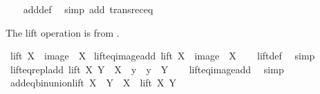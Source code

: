 \begin{isabellebody}
%
\isadelimproof
\ \ %
\endisadelimproof
%
\isatagproof
{}\isamarkupfalse%
\ add{\isacharunderscore}{\kern0pt}def\ \isamarkupfalse%
\ {\isacharparenleft}{\kern0pt}simp\ add{\isacharcolon}{\kern0pt}\ transrec{\isacharunderscore}{\kern0pt}eq{\isacharparenright}{\kern0pt}%
\endisatagproof
{\isafoldproof}%
%
\isadelimproof
%
\endisadelimproof
%
\begin{isamarkuptext}%
The lift operation is from \cite{kirby_set_arithemtics}.%
\end{isamarkuptext}\isamarkuptrue%
\isamarkupfalse%
\ {\isachardoublequoteopen}lift\ X\ {\isasymequiv}\ image\ {\isacharparenleft}{\kern0pt}{\isacharparenleft}{\kern0pt}{\isacharplus}{\kern0pt}{\isacharparenright}{\kern0pt}\ X{\isacharparenright}{\kern0pt}{\isachardoublequoteclose}\isanewline
\isanewline
{}\isamarkupfalse%
\ lift{\isacharunderscore}{\kern0pt}eq{\isacharunderscore}{\kern0pt}image{\isacharunderscore}{\kern0pt}add{\isacharcolon}{\kern0pt}\ {\isachardoublequoteopen}lift\ X\ {\isacharequal}{\kern0pt}\ image\ {\isacharparenleft}{\kern0pt}{\isacharparenleft}{\kern0pt}{\isacharplus}{\kern0pt}{\isacharparenright}{\kern0pt}\ X{\isacharparenright}{\kern0pt}{\isachardoublequoteclose}\isanewline
%
\isadelimproof
\ \ %
\endisadelimproof
%
\isatagproof
{}\isamarkupfalse%
\ lift{\isacharunderscore}{\kern0pt}def\ \isamarkupfalse%
\ simp%
\endisatagproof
{\isafoldproof}%
%
\isadelimproof
\isanewline
%
\endisadelimproof
\isanewline
{}\isamarkupfalse%
\ lift{\isacharunderscore}{\kern0pt}eq{\isacharunderscore}{\kern0pt}repl{\isacharunderscore}{\kern0pt}add{\isacharcolon}{\kern0pt}\ {\isachardoublequoteopen}lift\ X\ Y\ {\isacharequal}{\kern0pt}\ {\isacharbraceleft}{\kern0pt}X\ {\isacharplus}{\kern0pt}\ y\ {\isacharbar}{\kern0pt}\ y\ {\isasymin}\ Y{\isacharbraceright}{\kern0pt}{\isachardoublequoteclose}\isanewline
%
\isadelimproof
\ \ %
\endisadelimproof
%
\isatagproof
{}\isamarkupfalse%
\ lift{\isacharunderscore}{\kern0pt}eq{\isacharunderscore}{\kern0pt}image{\isacharunderscore}{\kern0pt}add\ \isamarkupfalse%
\ simp%
\endisatagproof
{\isafoldproof}%
%
\isadelimproof
\isanewline
%
\endisadelimproof
\isanewline
{}\isamarkupfalse%
\ add{\isacharunderscore}{\kern0pt}eq{\isacharunderscore}{\kern0pt}bin{\isacharunderscore}{\kern0pt}union{\isacharunderscore}{\kern0pt}lift{\isacharcolon}{\kern0pt}\ {\isachardoublequoteopen}X\ {\isacharplus}{\kern0pt}\ Y\ {\isacharequal}{\kern0pt}\ X\ {\isasymunion}\ lift\ X\ Y{\isachardoublequoteclose}\isanewline

\end{isabellebody}
